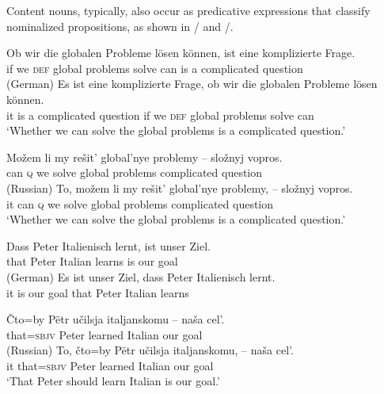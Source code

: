 \documentclass[output=paper,
colorlinks,
citecolor=brown,
newtxmath
]{langscibook}
\begin{document}
Content nouns, typically, also occur as predicative expressions that classify nominalized propositions, as shown in / and /.

\ea\label{ex:27.1}
    \ea\label{ex:27a'} \gll Ob wir die globalen Probleme lösen können, ist eine komplizierte Frage.\\
    if we \textsc{def} global problems solve can is a complicated question\\ \hfill (German)
    \ex\label{ex:27a''} \gll Es ist eine komplizierte Frage, ob wir die globalen Probleme lösen können.\\
    it is a complicated question if we \textsc{def} global problems solve can\\
    \z
    \glt `Whether we can solve the global problems is a complicated question.'
\z

\ea\label{ex:27.2}
    \ea\label{ex:27b'} \gll Možem li my rešit' global'nye problemy -- složnyj vopros.\\
    can \textsc{q} we solve global problems {} complicated question \\
    \glt \hfill (Russian)
    \ex\label{ex:27b''} \gll To, možem li my rešit' global'nye problemy, -- složnyj vopros.\\
    it can \textsc{q} we solve global problems {} complicated question\\
    \z
    \glt `Whether we can solve the global problems is a complicated question.'
\z

\ea\label{ex:28.1}
    \ea\label{ex:28a'} \gll Dass Peter Italienisch lernt, ist unser Ziel.\\
        that Peter Italian learns is our goal\\ \hfill (German)
    \ex\label{ex:28a''} \gll Es ist unser Ziel, dass Peter Italienisch lernt.\\
        it is our goal that Peter Italian learns\\
    \z
\z

\ea\label{ex:28.2}
    \ea\label{ex:28b'} \gll Čto=by Pëtr učilsja italjanskomu -- naša cel'.\\
        that=\textsc{sbjv} Peter learned Italian {} our goal\\ \hfill (Russian)
    \ex\label{ex:28b''} \gll To, čto=by Pëtr učilsja italjanskomu, -- naša cel'.\\
        it that=\textsc{sbjv} Peter learned Italian {} our goal\\
    \z
    \glt `That Peter should learn Italian is our goal.'
\z
\end{document}
